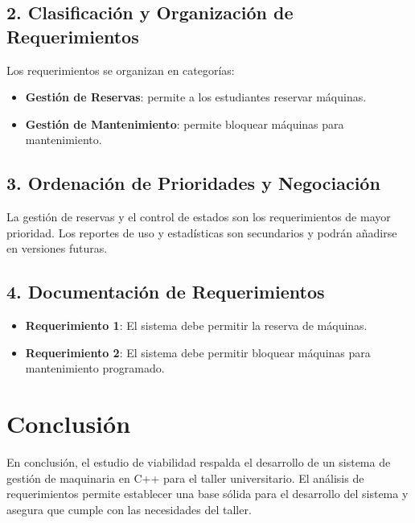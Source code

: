 \documentclass[12pt]{article}
\begin{document}
\subsection{2. Clasificación y Organización de Requerimientos}
Los requerimientos se organizan en categorías:
\begin{itemize}
    \item \textbf{Gestión de Reservas}: permite a los estudiantes reservar máquinas.
    \item \textbf{Gestión de Mantenimiento}: permite bloquear máquinas para mantenimiento.
\end{itemize}

\subsection{3. Ordenación de Prioridades y Negociación}
La gestión de reservas y el control de estados son los requerimientos de mayor prioridad. Los reportes de uso y estadísticas son secundarios y podrán añadirse en versiones futuras.

\subsection{4. Documentación de Requerimientos}
\begin{itemize}
    \item \textbf{Requerimiento 1}: El sistema debe permitir la reserva de máquinas.
    \item \textbf{Requerimiento 2}: El sistema debe permitir bloquear máquinas para mantenimiento programado.
\end{itemize}

\section{Conclusión}
En conclusión, el estudio de viabilidad respalda el desarrollo de un sistema de gestión de maquinaria en C++ para el taller universitario. El análisis de requerimientos permite establecer una base sólida para el desarrollo del sistema y asegura que cumple con las necesidades del taller.
\end{document}
